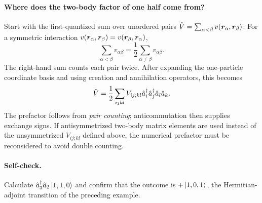 \paragraph{Where does the two-body factor of one half come from?}
Start with the first-quantized sum over unordered pairs
$\hat{V}=\sum_{\alpha<\beta}v(\bm{r}_\alpha,\bm{r}_\beta)$.
For a symmetric interaction
$v(\bm{r}_\alpha,\bm{r}_\beta)
=v(\bm{r}_\beta,\bm{r}_\alpha)$,
\begin{equation}
\sum_{\alpha<\beta}v_{\alpha\beta}
=\frac12\sum_{\alpha\neq\beta}v_{\alpha\beta}.
\end{equation}
The right-hand sum counts each pair twice. After expanding
the one-particle coordinate basis and using creation
and annihilation operators, this becomes
\begin{equation}
\hat{V}=\frac12\sum_{ijkl}
V_{ij;kl}\hat{a}_i^\dagger\hat{a}_j^\dagger
\hat{a}_l\hat{a}_k.
\end{equation}
The prefactor follows from \emph{pair counting}; anticommutation
then supplies exchange signs. If antisymmetrized two-body
matrix elements are used instead of the unsymmetrized
$V_{ij;kl}$ defined above, the numerical prefactor must
be reconsidered to avoid double counting.

\paragraph{Self-check.}
Calculate $\hat{a}_3^\dagger\hat{a}_2\left|1,1,0\right\rangle$
and confirm that the outcome is $+\left|1,0,1\right\rangle$,
the Hermitian-adjoint transition of the preceding example.

